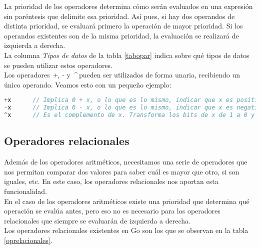	La prioridad de los operadores determina cómo serán evaluados en una
	expresión sin paréntesis que delimite esa prioridad. Así pues, si hay dos
	operandos de distinta prioridad, se evaluará primero la operación de mayor
	prioridad. Si los operandos existentes son de la misma prioridad, la
	evaluación se realizará de izquierda a derecha.\\

	La columna \emph{Tipos de datos} de la tabla \ref{tabopar} indica sobre qué
	tipos de datos se pueden utilizar estos operadores.\\

	Los operadores \emph{+}, \emph{-} y \emph{\textasciicircum} pueden ser
	utilizados de forma unaria, recibiendo un único operando. Veamos esto con un
	pequeño ejemplo:

\begin{minipage}{17.1cm}
\begin{lstlisting}[language=go,numbers=none,caption=Ejemplo de operandos aritméticos unarios,label=oparitunarios]
+x 		// Implica 0 + x, o lo que es lo mismo, indicar que x es positivo.
-x 		// Implica 0 - x, o lo que es lo mismo, indicar que x es negativo.
^x 		// Es el complemento de x. Transforma los bits de x de 1 a 0 y los que estén en 0 a 1.
\end{lstlisting}
\end{minipage}

	\subsection{Operadores relacionales}

	Además de los operadores aritméticos, necesitamos una serie de operadores
	que nos permitan comparar dos valores para saber cuál es mayor que otro, si
	son iguales, etc. En este caso, los operadores relacionales nos aportan esta
	funcionalidad.\\

	En el caso de los operadores aritméticos existe una prioridad que determina
	qué operación se evalúa antes, pero eso no es necesario para los operadores
	relacionales que siempre se evaluarán de izquierda a derecha.\\

	Los operadores relacionales existentes en Go son los que se observan en la
	tabla \ref{oprelacionales}.


